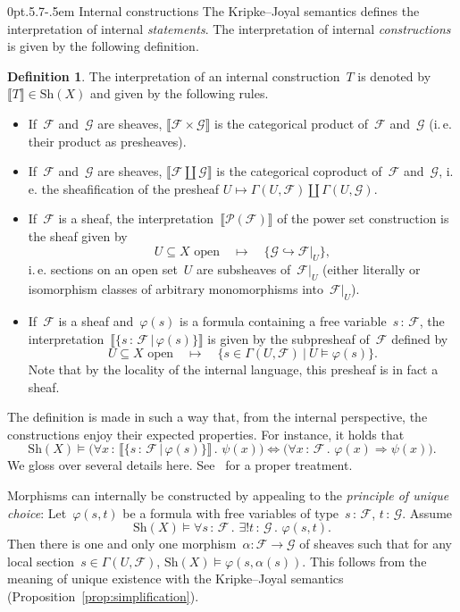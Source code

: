 \documentclass[10pt,reqno,a4paper]{amsbook}
\makeatletter
\theoremstyle{definition}
\newtheorem{defn}{Definition}[section]
\theoremstyle{plain}
\theoremstyle{remark}
\newcommand{\F}{\mathcal{F}}
\renewcommand{\G}{\mathcal{G}}
\renewcommand{\P}{\mathcal{P}}
\newcommand{\Sh}{\mathrm{Sh}}
\newcommand{\?}{\,{:}\,}
\renewcommand{\_}{\mathpunct{.}\,}
\newcommand{\brak}[1]{{\llbracket{#1}\rrbracket}}
\newcommand{\ie}{i.\,e.\@\xspace}
\def\subsection{\@startsection{subsection}{2}%
  {0pt}{.5\linespacing\@plus.7\linespacing}{-.5em}%
  {\normalfont\bfseries}}
\makeatother
\begin{document}
\subsection{Internal constructions}
\label{sect:internal-constructions}
The Kripke--Joyal semantics defines the
interpretation of internal \emph{statements}. The interpretation of internal
\emph{constructions} is given by the following definition.

\begin{defn}\label{defn:interpretation-internal-constructions}
The interpretation of an internal construction~$T$
is denoted by~$\brak{T} \in \Sh(X)$ and given by the following rules.
\begin{itemize}\item If~$\F$ and~$\G$ are sheaves, $\brak{\F \times \G}$ is the
categorical product of~$\F$ and~$\G$ (\ie their product as presheaves).
\item If~$\F$ and~$\G$ are sheaves, $\brak{\F \amalg \G}$ is the categorical
coproduct of~$\F$ and~$\G$, \ie the sheafification of the presheaf
$U \mapsto \Gamma(U,\F) \amalg \Gamma(U,\G)$.
\item If~$\F$ is a sheaf, the interpretation~$\brak{\P(\F)}$ of the power set
construction is the sheaf given by
\[ \text{$U \subseteq X$ open} \quad\longmapsto\quad \{ \G \hookrightarrow \F|_U \}, \]
\ie sections on an open set~$U$ are subsheaves of~$\F|_U$ (either literally
or isomorphism classes of arbitrary monomorphisms into~$\F|_U$).
\item If~$\F$ is a sheaf and~$\varphi(s)$ is a formula containing a free
variable~$s\?\F$, the interpretation~$\brak{\{s\?\F\,|\,\varphi(s)\}}$ is given
by the subpresheaf of~$\F$ defined by
\[ \text{$U \subseteq X$ open} \quad\longmapsto\quad \{ s \in \Gamma(U,\F) \ |\
  U \models \varphi(s) \}. \]
Note that by the locality of the internal language, this presheaf is in fact a
sheaf.
\end{itemize}
\end{defn}

The definition is made in such a way that, from the internal perspective, the
constructions enjoy their expected properties. For instance, it holds that
\[ \Sh(X) \models
  \bigl(\forall x\?\brak{\{s\?\F \,|\, \varphi(s)\}}\_ \psi(x)\bigr)
  \Longleftrightarrow
  \bigl(\forall x\?\F\_ \varphi(x) \Rightarrow \psi(x)\bigr). \]
We gloss over several details here. See~\cite[Section~D4.1]{johnstone:elephant} for
a proper treatment.

Morphisms can internally be constructed by appealing to the \emph{principle of
unique choice}: Let~$\varphi(s,t)$ be a formula with free variables of
type~$s\?\F$, $t\?\G$. Assume
\[ \Sh(X) \models \forall s\?\F\_ \exists!t\?\G\_ \varphi(s,t). \]
Then there is one and only one morphism~$\alpha : \F \to \G$ of sheaves such
that for any local section~$s \in \Gamma(U,\F)$, $\Sh(X) \models
\varphi(s,\alpha(s))$. This follows from the meaning of unique existence with
the Kripke--Joyal semantics (Proposition~\ref{prop:simplification}).
\end{document}
